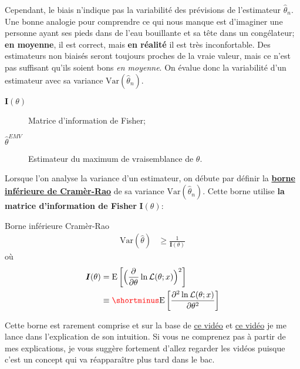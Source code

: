 \documentclass[10pt, french]{article}
\begin{document}
\begin{multicols*}{2}
Cependant, le biais n'indique pas la variabilité des prévisions de l'estimateur $\hat{\theta}_{n}$. Une bonne analogie pour comprendre ce qui nous manque est d’imaginer une personne ayant ses pieds dans de l'eau bouillante et sa tête dans un congélateur; \textbf{en moyenne}, il est correct, mais \textbf{en réalité} il est très inconfortable. Des estimateurs non biaisés seront toujours proches de la vraie valeur, mais ce n'est pas suffisant qu'ils soient bons \textit{en moyenne}. On évalue donc la variabilité d'un estimateur avec sa variance $\text{Var}(\hat{\theta}_{n})$.

\begin{distributions}[Notation]
\begin{description}
	\item[$\bm{I}(\theta)$]	Matrice d'information de Fisher;
	\item[$\hat{\theta}^{EMV}$]	Estimateur du maximum de vraisemblance de $\theta$.
\end{description}
\end{distributions}

Lorsque l'on analyse la variance d'un estimateur, on débute par définir la \hyperlink{cramer-rao}{\textbf{borne inférieure de Cramèr-Rao}} de sa variance $\text{Var}(\hat{\theta}_{n})$. Cette borne utilise \textbf{la matrice d'information de Fisher} $\bm{I}(\theta)$:

\begin{algo}{\hypertarget{cramer-rao}{Borne inférieure Cramèr-Rao}}
\begin{align*}
	\text{Var}(\hat{\theta}) 
	&\geq	\frac{1}{\bm{I}(\theta)}
\end{align*}
où
\begin{align*}
	\bm{I}(\theta) 
	&=	\text{E}\left[\Big(\deriv{\theta}{} \ln \mathcal{L}(\theta; x)\Big)^{2}\right]	\\
	&\equiv	{\color{red}\shortminus}\text{E}\left[\deriv[2]{\theta}{\ln \mathcal{L}(\theta; x)}\right]
\end{align*}
\end{algo}

Cette borne est rarement comprise et sur la base de \hyperlink{https://www.youtube.com/watch?v=igQIsYAlKlY}{\color{blue}ce vidéo} et \hyperlink{https://www.youtube.com/watch?v=i0JiSddCXMM}{\color{blue}ce vidéo} je me lance dans l'explication de son intuition. Si vous ne comprenez pas à partir de mes explications, je vous suggère fortement d'allez regarder les vidéos puisque c'est un concept qui va réapparaître plus tard dans le bac.\\


\end{multicols*}
\end{document}
